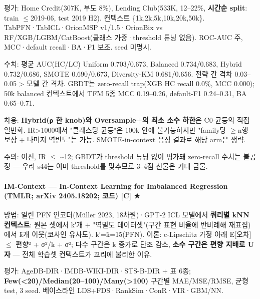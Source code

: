 \par\noindent \textbullet\enspace 평가: Home Credit(307K, 부도 8\%), Lending Club(533K, 12–22\%, \textbf{시간순 split}: train \ensuremath{\leq}2019-06, test 2019 H2). 컨텍스트 \{1k,2k,5k,10k,20k,50k\}. TabPFN·TabICL·OrionMSP v1/\allowbreak{}1.5·OrionBix vs RF/\allowbreak{}XGB/\allowbreak{}LGBM/\allowbreak{}CatBoost(클래스 가중·threshold 튜닝 없음). ROC-AUC 주, MCC·default recall·BA·F1 보조. seed 미명시.


\par\noindent \textbullet\enspace 수치: 평균 AUC(HC/\allowbreak{}LC) Uniform 0.703/\allowbreak{}0.673, Balanced 0.734/\allowbreak{}0.683, Hybrid 0.732/\allowbreak{}0.686, SMOTE 0.690/\allowbreak{}0.673, Diversity-KM 0.681/\allowbreak{}0.656. 전략 간 격차 0.03–0.05 > 모델 간 격차. GBDT는 zero-recall trap(XGB HC recall 0.0\%, MCC 0.000); 50k balanced 컨텍스트에서 TFM 5종 MCC 0.19–0.26, default-F1 0.24–0.31, BA 0.65–0.71.


\par\noindent \textbullet\enspace 차용: \textbf{Hybrid(ρ 한 knob)와 Oversample+\allowbreak{}의 최소 소수 하한}은 C0-균등의 직접 일반화. IR>1000에서 "클래스당 균등"은 100k 안에 불가능하지만 "family당 \ensuremath{\geq}n행 보장 +\allowbreak{} 나머지 역빈도"는 가능. SMOTE-in-context 음성 결과로 해당 arm은 생략.


\par\noindent \textbullet\enspace 주의: 이진, IR \ensuremath{\leq} \textasciitilde{}12; GBDT가 threshold 튜닝 없이 평가돼 zero-recall 수치는 불공정 — 우리 s44는 이미 threshold를 맞추므로 3–4점 선물은 기대 금물.


\paragraph{IM-Context — In-Context Learning for Imbalanced Regression (TMLR; arXiv 2405.18202; 코드) [C] ★}
\par\noindent \textbullet\enspace 방법: 얼린 PFN 인코더(Müller 2023, 18차원)·GPT-2 ICL 모델에서 \textbf{쿼리별 kNN 컨텍스트}: 원본 셋에서 k′개 +\allowbreak{} "역밀도 데이터셋"(구간 표현 비율에 반비례해 재표집)에서 k̃개 이웃(코사인 유사도). k′=\allowbreak{}k̃=\allowbreak{}15(PFN). 이론: c-Lipschitz 가정 아래 E[오차] \ensuremath{\leq} 편향² +\allowbreak{} σ²/\allowbreak{}k +\allowbreak{} σ²; 다수 구간은 k 증가로 단조 감소, \textbf{소수 구간은 편향 지배로 U자} — 전체 학습셋 컨텍스트가 꼬리에 불리한 이유.


\par\noindent \textbullet\enspace 평가: AgeDB-DIR·IMDB-WIKI-DIR·STS-B-DIR +\allowbreak{} 표 6종; \textbf{Few(<20)/\allowbreak{}Median(20–100)/\allowbreak{}Many(>100)} 구간별 MAE/\allowbreak{}MSE/\allowbreak{}RMSE, 균형 test, 3 seed. 베이스라인 LDS+\allowbreak{}FDS·RankSim·ConR·VIR·GBM/\allowbreak{}NN.


